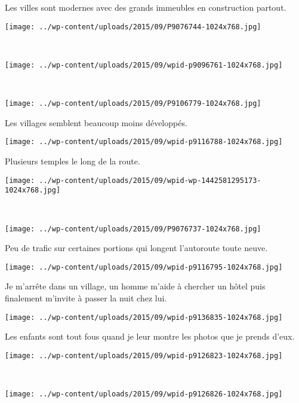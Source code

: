  Les villes sont modernes avec des grands immeubles en construction partout.
\begin{center} \texttt{[image: ../wp-content/uploads/2015/09/P9076744-1024x768.jpg]} \end{center}
~
\begin{center} \texttt{[image: ../wp-content/uploads/2015/09/wpid-p9096761-1024x768.jpg]} \end{center}
\vspace{-\topsep}
\pagebreak
~
\begin{center} \texttt{[image: ../wp-content/uploads/2015/09/P9106779-1024x768.jpg]} \end{center}

 Les villages semblent beaucoup moins développés.
\begin{center} \texttt{[image: ../wp-content/uploads/2015/09/wpid-p9116788-1024x768.jpg]} \end{center}
\vspace{-\topsep}
\pagebreak

 Plusieurs temples le long de la route.
\begin{center} \texttt{[image: ../wp-content/uploads/2015/09/wpid-wp-1442581295173-1024x768.jpg]} \end{center}
~
\begin{center} \texttt{[image: ../wp-content/uploads/2015/09/P9076737-1024x768.jpg]} \end{center}
\vspace{-\topsep}
\pagebreak

  Peu de trafic sur certaines portions qui longent l'autoroute toute neuve.\\
  \vspace{0.75mm}
\begin{center} \texttt{[image: ../wp-content/uploads/2015/09/wpid-p9116795-1024x768.jpg]} \end{center}

 Je m'arrête dans un village, un homme m'aide à chercher un hôtel puis finalement m'invite à passer la nuit chez lui.
\begin{center} \texttt{[image: ../wp-content/uploads/2015/09/wpid-p9136835-1024x768.jpg]} \end{center}
\vspace{-\topsep}
\pagebreak

  Les enfants sont tout fous quand je leur montre les photos que je prends d'eux.
\begin{center} \texttt{[image: ../wp-content/uploads/2015/09/wpid-p9126823-1024x768.jpg]} \end{center}
~\\
\begin{center} \texttt{[image: ../wp-content/uploads/2015/09/wpid-p9126826-1024x768.jpg]} \end{center}
\vspace{-\topsep}
\pagebreak
 
